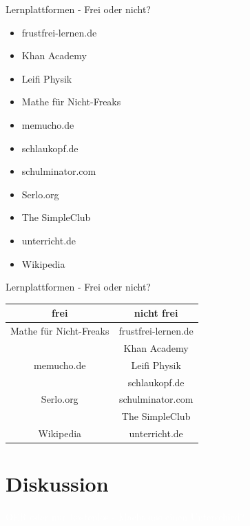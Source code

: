 \documentclass[14pt, usenames, dvipsnames, notes]{beamer}
\begin{document}
	\begin{frame}{Lernplattformen - Frei oder nicht?}

		\begin{itemize}
			\item frustfrei-lernen.de
			\item Khan Academy
			\item Leifi Physik
			\item Mathe für Nicht-Freaks
			\item memucho.de
			\item schlaukopf.de
			\item schulminator.com
			\item Serlo.org
			\item The SimpleClub
			\item unterricht.de
			\item Wikipedia
		\end{itemize}
	\end{frame}
	\begin{frame}{Lernplattformen - Frei oder nicht?}
		\begin{tabular}{c|c}
			\textbf{frei} & \textbf{nicht frei} \\
			\hline
			Mathe für Nicht-Freaks & frustfrei-lernen.de \\
			& Khan Academy \\
			memucho.de & Leifi Physik \\
			& schlaukopf.de \\
			Serlo.org & schulminator.com \\
			& The SimpleClub \\
			Wikipedia & unterricht.de \\
		\end{tabular}
	\end{frame}

\section{Diskussion}



\begin{frame}{}
    \begin{center}
        \textcolor{white}{\LARGE OER oder \glqq nur\grqq~kostenlos - Macht das einen Unterschied?}
    \end{center}
\end{frame}
\end{document}
